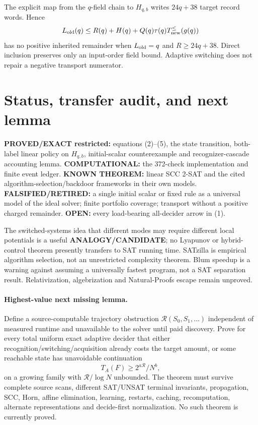 \documentclass[11pt]{article}
\begin{document}
The explicit map from the $q$-field chain to $H_{q,b}$ writes
$24q+38$ target record words.  Hence
\[
L_{\rm old}(q)\le R(q)+H(q)+Q(q)\tau(q)T_{\rm new}^{\le}(g(q))
\]
has no positive inherited remainder when $L_{\rm old}=q$ and
$R\ge24q+38$.  Direct inclusion preserves only an input-order field bound.
Adaptive switching does not repair a negative transport numerator.

\section{Status, transfer audit, and next lemma}
\textbf{PROVED/EXACT restricted:} equations (2)--(5), the state transition,
both-label linear policy on $H_{q,b}$, initial-scalar counterexample and
recognizer-cascade accounting lemma.  \textbf{COMPUTATIONAL:} the 372-check
implementation and finite event ledger.  \textbf{KNOWN THEOREM:} linear SCC
2-SAT and the cited algorithm-selection/backdoor frameworks in their own
models.  \textbf{FALSIFIED/RETIRED:} a single initial scalar or fixed rule as
a universal model of the ideal solver; finite portfolio coverage; transport
without a positive charged remainder.  \textbf{OPEN:} every load-bearing
all-decider arrow in (1).

The switched-systems idea that different modes may require different local
potentials is a useful \textbf{ANALOGY/CANDIDATE}; no Lyapunov or hybrid-control
theorem presently transfers to SAT running time.  SATzilla is empirical
algorithm selection, not an unrestricted complexity theorem.  Blum speedup
is a warning against assuming a universally fastest program, not a SAT
separation result.  Relativization, algebrization and Natural-Proofs escape
remain unproved.

\paragraph{Highest-value next missing lemma.}
Define a source-computable trajectory obstruction
$\mathcal R(S_0,S_1,\ldots)$ independent of measured runtime and unavailable
to the solver until paid discovery.  Prove for every total uniform exact
adaptive decider that either recognition/switching/acquisition already costs
the target amount, or some reachable state has unavoidable continuation
\[
T_A(F)\ge 2^{a\mathcal R}/N^b,
\]
on a growing family with $\mathcal R/\log N$ unbounded.  The theorem must
survive complete source scans, different SAT/UNSAT terminal invariants,
propagation, SCC, Horn, affine elimination, learning, restarts, caching,
recomputation, alternate representations and decide-first normalization.
No such theorem is currently proved.
\end{document}
